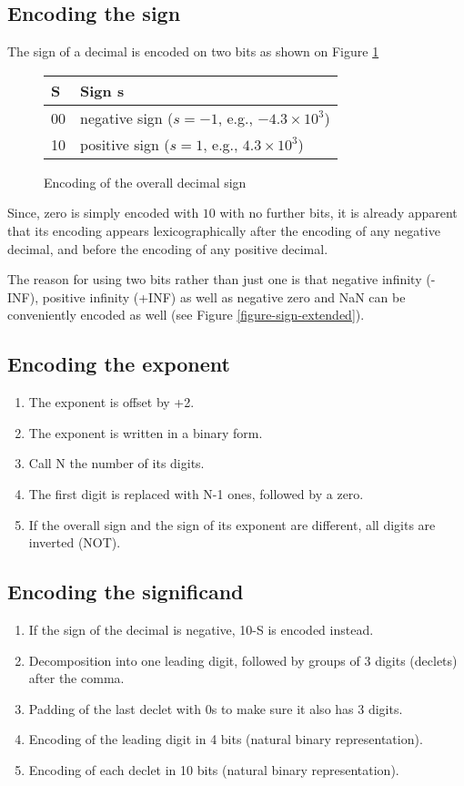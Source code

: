 \documentclass{acm_proc_article-sp}
\begin{document}
\subsection{Encoding the sign}

The sign of a decimal is encoded on two bits as shown on Figure \ref{figure-sign}

\begin{figure}
\caption{Encoding of the overall decimal sign}
\label{figure-sign}
\center
\begin{tabular}{|l|l|}
\hline
S & Sign s \\
\hline
00 &  negative sign ($s=-1$, e.g., $-4.3\times10^3$)\\
\hline
10 & positive sign ($s=1$, e.g., $4.3\times10^3$)\\
\hline
\end{tabular}
\end{figure}

Since, zero is simply encoded with $10$ with no further bits, it is already apparent that its encoding appears lexicographically after the encoding of any negative decimal, and before the encoding of any positive decimal.

The reason for using two bits rather than just one is that negative infinity (-INF), positive infinity (+INF) as well as negative zero and NaN can be conveniently encoded as well (see Figure \ref{figure-sign-extended}).

\subsection{Encoding the exponent}
\begin{enumerate}
\item The exponent is offset by +2.
\item  The exponent is written in a binary form.
\item  Call N the number of its digits.
\item  The first digit is replaced with N-1 ones, followed by a zero.
\item  If the overall sign and the sign of its exponent are different, all digits are inverted (NOT).
\end{enumerate}

\subsection{Encoding the significand}
\begin{enumerate}
\item If the sign of the decimal is negative, 10-S is encoded instead.
\item Decomposition into one leading digit, followed by groups of 3 digits (declets) after the comma.
\item Padding of the last declet with 0s to make sure it also has 3 digits.
\item Encoding of the leading digit in 4 bits (natural binary representation).
\item Encoding of each declet in 10 bits (natural binary representation).
\end{enumerate}
\end{document}
